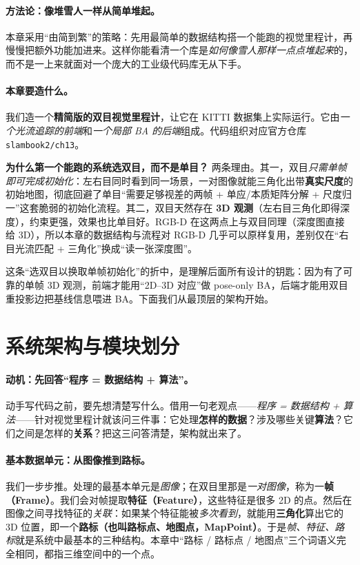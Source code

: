 \paragraph{方法论：像堆雪人一样从简单堆起。}
本章采用“由简到繁”的策略：先用最简单的数据结构搭一个能跑的视觉里程计，再慢慢把额外功能加进来。这样你能看清一个库是\emph{如何像雪人那样一点点堆起来}的，而不是一上来就面对一个庞大的工业级代码库无从下手。

\paragraph{本章要造什么。}
我们造一个\textbf{精简版的双目视觉里程计}，让它在 KITTI 数据集上实际运行。它由\emph{一个光流追踪的前端}和\emph{一个局部 BA 的后端}组成。代码组织对应官方仓库 \texttt{slambook2/\allowbreak ch13}。

\begin{insight}
\textbf{为什么第一个能跑的系统选双目，而不是单目？}
两条理由。其一，双目\emph{只需单帧即可完成初始化}：左右目同时看到同一场景，一对图像就能三角化出带\textbf{真实尺度}的初始地图，彻底回避了单目“需要足够视差的两帧 + 单应/本质矩阵分解 + 尺度归一”这套脆弱的初始化流程。其二，双目天然存在 \textbf{3D 观测}（左右目三角化即得深度），约束更强，效果也比单目好。RGB-D 在这两点上与双目同理（深度图直接给 3D），所以本章的数据结构与流程对 RGB-D 几乎可以原样复用，差别仅在“右目光流匹配 + 三角化”换成“读一张深度图”。
\end{insight}

这条“选双目以换取单帧初始化”的折中，是理解后面所有设计的钥匙：因为有了可靠的单帧 3D 观测，前端才能用“2D--3D 对应”做 pose-only BA，后端才能用双目重投影边把基线信息喂进 BA。下面我们从最顶层的架构开始。

\section{系统架构与模块划分}
\label{sec:sys-arch}

\paragraph{动机：先回答“程序 = 数据结构 + 算法”。}
动手写代码之前，要先想清楚写什么。借用一句老观点——\emph{程序 = 数据结构 + 算法}——针对视觉里程计就该问三件事：它处理\textbf{怎样的数据}？涉及哪些关键\textbf{算法}？它们之间是怎样的\textbf{关系}？把这三问答清楚，架构就出来了。

\paragraph{基本数据单元：从图像推到路标。}
我们一步步推。处理的最基本单元是\emph{图像}；在双目里那是\emph{一对图像}，称为一\textbf{帧（Frame）}。我们会对帧提取\textbf{特征（Feature）}，这些特征是很多 2D 的点。然后在图像之间寻找特征的\emph{关联}：如果某个特征能被\emph{多次看到}，就能用\textbf{三角化}算出它的 3D 位置，即一个\textbf{路标（也叫路标点、地图点，MapPoint）}。于是\emph{帧、特征、路标}就是系统中最基本的三种结构。本章中“路标 / 路标点 / 地图点”三个词语义完全相同，都指三维空间中的一个点。

